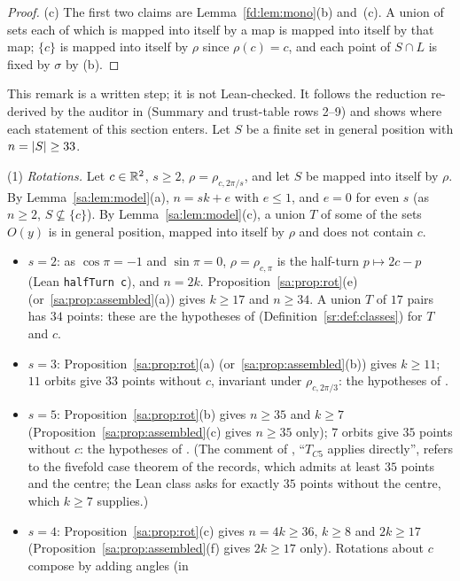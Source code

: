 \begin{proof}
(c) The first two claims are Lemma~\ref{fd:lem:mono}(b) and~(c). A union of sets each of which is mapped into itself
by a map is mapped into itself by that map; $\{c\}$ is mapped into itself by $\rho$ since $\rho(c)=c$, and each point
of $S\cap L$ is fixed by $\sigma$ by (b).
\end{proof}

\begin{remark}\label{sa:rem:use}
This remark is a written step; it is not Lean-checked. It follows the reduction re-derived by the auditor in
 (Summary and trust-table rows 2--9) and shows where each statement of this
section enters. Let $S$ be a finite set in general position with $n=\lvert S\rvert\ge33$.

(1) \emph{Rotations.} Let $c\in\mathbb R^2$, $s\ge2$, $\rho=\rho_{c,2\pi/s}$, and let $S$ be mapped into itself by $\rho$.
By Lemma~\ref{sa:lem:model}(a), $n=sk+e$ with $e\le1$, and $e=0$ for even $s$ (as $n\ge2$, $S\not\subseteq\{c\}$). By
Lemma~\ref{sa:lem:model}(c), a union $T$ of some of the sets $O(y)$ is in general position, mapped into itself by
$\rho$ and does not contain $c$.
\begin{itemize}
\item $s=2$: as $\cos\pi=-1$ and $\sin\pi=0$, $\rho=\rho_{c,\pi}$ is the half-turn $p\mapsto2c-p$ (Lean
  \mbox{\texttt{halfTurn c}}), and $n=2k$. Proposition~\ref{sa:prop:rot}(e) (or~\ref{sa:prop:assembled}(a)) gives
  $k\ge17$ and $n\ge34$. A union $T$ of $17$ pairs has $34$ points: these are the hypotheses of 
  (Definition~\ref{sr:def:classes}) for $T$ and $c$.
\item $s=3$: Proposition~\ref{sa:prop:rot}(a) (or~\ref{sa:prop:assembled}(b)) gives $k\ge11$; $11$ orbits give
  $33$ points without $c$, invariant under $\rho_{c,2\pi/3}$: the hypotheses of .
\item $s=5$: Proposition~\ref{sa:prop:rot}(b) gives $n\ge35$ and $k\ge7$ (Proposition~\ref{sa:prop:assembled}(c)
  gives $n\ge35$ only); $7$ orbits give $35$ points without $c$: the hypotheses of . (The comment of
  , ``$T_{C5}$ applies directly'', refers to the fivefold case theorem of the records, which admits
  at least $35$ points and the centre; the Lean class asks for exactly $35$ points without the centre, which $k\ge7$
  supplies.)
\item $s=4$: Proposition~\ref{sa:prop:rot}(c) gives $n=4k\ge36$, $k\ge8$ and $2k\ge17$
  (Proposition~\ref{sa:prop:assembled}(f) gives $2k\ge17$ only). Rotations about $c$ compose by adding angles (in

\end{itemize}
\end{remark}
